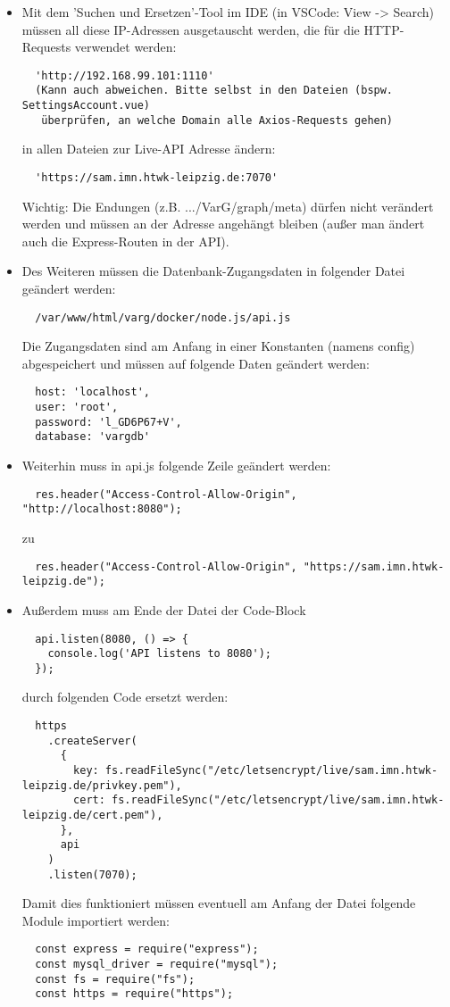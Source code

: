 \documentclass[twoside]{report}
\begin{document}
\begin{itemize}
\item Mit dem 'Suchen und Ersetzen'-Tool im IDE (in VSCode: View -> Search) müssen all diese IP-Adressen ausgetauscht werden, die für die HTTP-Requests verwendet werden:
\begin{verbatim}
  'http://192.168.99.101:1110' 
  (Kann auch abweichen. Bitte selbst in den Dateien (bspw. SettingsAccount.vue)
   überprüfen, an welche Domain alle Axios-Requests gehen)
\end{verbatim}
in allen Dateien zur Live-API Adresse ändern: 
\begin{verbatim}
  'https://sam.imn.htwk-leipzig.de:7070'
\end{verbatim}
Wichtig: Die Endungen (z.B. .../VarG/graph/meta) dürfen nicht verändert werden und müssen an der Adresse angehängt bleiben (außer man ändert auch die Express-Routen in der API).

\item Des Weiteren müssen die Datenbank-Zugangsdaten in folgender Datei geändert werden:
\begin{verbatim}
  /var/www/html/varg/docker/node.js/api.js
\end{verbatim}
Die Zugangsdaten sind am Anfang in einer Konstanten (namens config) abgespeichert und müssen auf folgende Daten geändert werden:
\begin{verbatim}
  host: 'localhost',
  user: 'root',
  password: 'l_GD6P67+V',
  database: 'vargdb'
\end{verbatim}
\item Weiterhin muss in api.js folgende Zeile geändert werden:
\begin{verbatim}
  res.header("Access-Control-Allow-Origin", "http://localhost:8080");
\end{verbatim}
zu
\begin{verbatim}
  res.header("Access-Control-Allow-Origin", "https://sam.imn.htwk-leipzig.de");
\end{verbatim}\newpage
\item Außerdem muss am Ende der Datei der Code-Block
\begin{verbatim}
  api.listen(8080, () => {
    console.log('API listens to 8080');
  });
\end{verbatim}
durch folgenden Code ersetzt werden:
\begin{verbatim}
  https
    .createServer(
      {
        key: fs.readFileSync("/etc/letsencrypt/live/sam.imn.htwk-leipzig.de/privkey.pem"),
        cert: fs.readFileSync("/etc/letsencrypt/live/sam.imn.htwk-leipzig.de/cert.pem"),
      },
      api
    )
    .listen(7070);
\end{verbatim}
Damit dies funktioniert müssen eventuell am Anfang der Datei folgende Module importiert werden:
\begin{verbatim}
  const express = require("express");
  const mysql_driver = require("mysql");
  const fs = require("fs");
  const https = require("https");
\end{verbatim}
\end{itemize}
\end{document}
